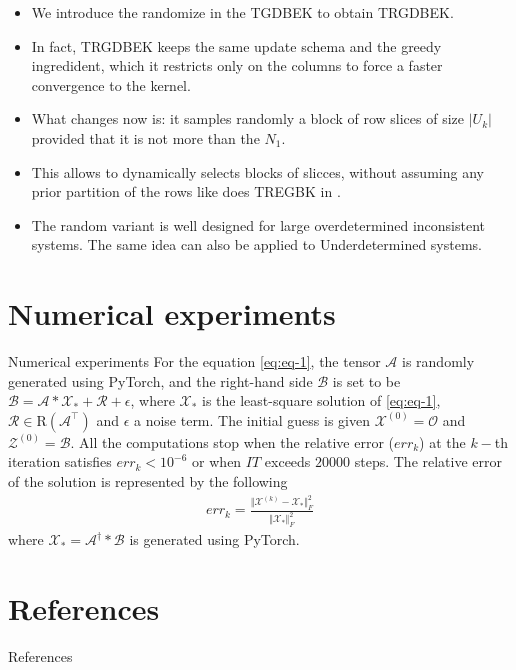 \documentclass[aspectratio=169]{beamer}
\def\fm#1{\mathcal{#1}}
\def\fm#1{\mathcal{#1}}
\def \x#1{\fm X^{(#1)}}
\begin{document}
\begin{frame}{}
\begin{itemize}
    \item We introduce the randomize in the TGDBEK  to obtain TRGDBEK.
    \item In fact, TRGDBEK keeps the same update schema and the greedy ingredident, which it restricts only on the columns to force a faster convergence to the kernel.
    \item What changes now is: it samples randomly a block of row slices of size $\vert U_k|$ provided that it is not more than the  $N_1$.
    \item This allows to dynamically selects blocks of slicces, without assuming any prior partition of the rows like does TREGBK  in \cite{huang2024tensor}.
    \item The random variant is well designed for large overdetermined inconsistent systems. The same idea can also be applied to Underdetermined systems.
\end{itemize}
\end{frame}
\section{Numerical experiments}
\begin{frame}{Numerical experiments}
For the equation \eqref{eq:eq-1}, the tensor $\fm A$ is randomly generated using PyTorch, and the right-hand side $\fm B$ is set to be $\fm B= \fm A * \fm X_\ast + \fm R + \epsilon$, where $\fm X_\ast$ is the least-square solution of \eqref{eq:eq-1}, $\fm R\in \text{R}(\fm A^\top)$ and $\epsilon$ a noise term. The initial guess is given $\x{0} = \fm O$ and $\fm Z^{(0)}=\fm B$. All the  computations stop when the relative error ($err_k$) at the $k-$th iteration satisfies $err_k < 10^{-6}$ or when $IT$ exceeds $20000$ steps. The relative error of the solution is represented by the following
\begin{align*}
    err_k = \frac{\Vert \x{k}-\fm X_\ast \Vert_F^2}{\Vert \fm X_\ast \Vert_F^2}
\end{align*}
where $\fm X_\ast = \fm A^\dagger * \fm B$ is generated using PyTorch.
\end{frame}




\section{References}
\begin{frame}{References}
\scriptsize


    
\end{frame}

\end{document}
